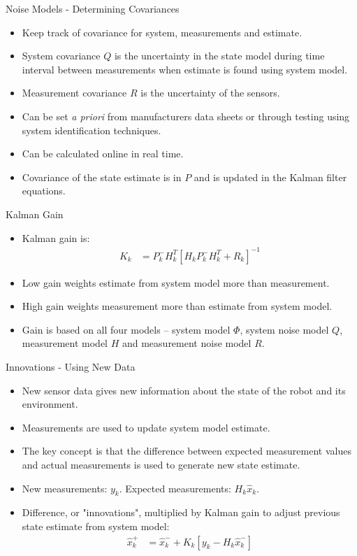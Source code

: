 \documentclass[hyperref={pdfpagelabels=false}]{beamer}
\begin{document}
\begin{frame}{Noise Models - Determining Covariances}
\begin{itemize}
\item Keep track of covariance for system, measurements and estimate.
\item System covariance $Q$ is the uncertainty in the state model during time interval between measurements when estimate is found using system model.
\item Measurement covariance $R$ is the uncertainty of the sensors.
\item Can be set \textit{a priori} from manufacturers data sheets or through testing using system identification techniques.
\item Can be calculated online in real time.
\item Covariance of the state estimate is in $P$ and is updated in the Kalman filter equations.
\end{itemize}
\end{frame}

\begin{frame}{Kalman Gain}
\begin{itemize}
\item Kalman gain is:
\begin{align*}
K_k &= P_k^-H_k^T\left[H_kP_k^-H_k^T + R_k\right]^{-1}
\end{align*}
\item Low gain weights estimate from system model more than measurement.
\item High gain weights measurement more than estimate from system model.
\item Gain is based on all four models -- system model $\Phi$, system noise model $Q$, measurement model $H$ and measurement noise model $R$.
\end{itemize}
\end{frame}

\begin{frame}{Innovations - Using New Data}
\begin{itemize}
\item New sensor data gives new information about the state of the robot and its environment.
\item Measurements are used to update system model estimate.
\item The key concept is that the difference between expected measurement values and actual measurements is used to generate new state estimate.
\item New measurements: $y_k$. Expected measurements: $H_k\hat{x}_k$.
\item Difference, or "innovations", multiplied by Kalman gain to adjust previous state estimate from system model:
\begin{align*}
\hat{x}_k^+ &= \hat{x}_k^- + K_k\left[y_k - H_k\hat{x}_k^-\right]
\end{align*}
\end{itemize}
\end{frame}
\end{document}
